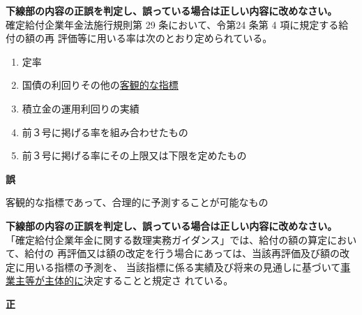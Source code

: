 \begin{truefalse}[年金1 2018 問題1(1)\textcircled{1}]
    \textbf{下線部の内容の正誤を判定し、誤っている場合は正しい内容に改めなさい。}
  \\

  確定給付企業年金法施行規則第 29 条において、令第24 条第 4 項に規定する給付の額の再
評価等に用いる率は次のとおり定められている。
\begin{enumerate}
  \item 定率
\item 国債の利回りその他の\underline{客観的な指標}
\item  積立金の運用利回りの実績
\item  前３号に掲げる率を組み合わせたもの
\item  前３号に掲げる率にその上限又は下限を定めたもの
\end{enumerate}
\end{truefalse}

\begin{answerbox}
  \textbf{誤}

  客観的な指標であって、合理的に予測することが可能なもの
\end{answerbox}

\begin{truefalse}[年金2 2021 問題1(1)\textcircled{2}]
      \textbf{下線部の内容の正誤を判定し、誤っている場合は正しい内容に改めなさい。}
  \\

  「確定給付企業年金に関する数理実務ガイダンス」では、給付の額の算定において、給付の
再評価又は額の改定を行う場合にあっては、当該再評価及び額の改定に用いる指標の予測を、
当該指標に係る実績及び将来の見通しに基づいて\underline{事業主等が主体的に}決定することと規定さ
れている。
\end{truefalse}

\begin{answerbox}
  \textbf{正}
\end{answerbox}

